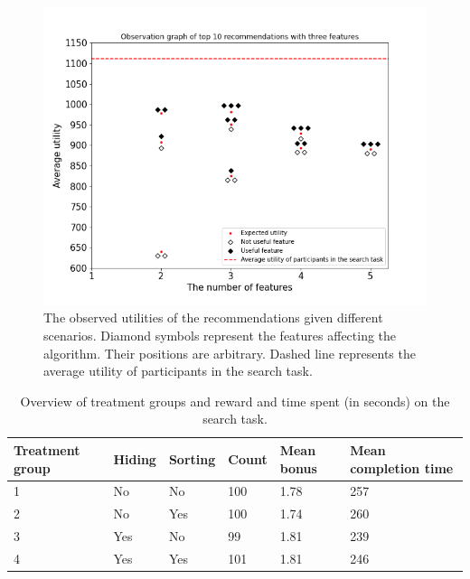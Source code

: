 \documentclass[a4paper,12pt]{article}
\begin{document}
\begin{figure}
    \centering
    \includegraphics[width=0.99\linewidth]{staticFiles/ThreeFeaturesObservedTop10SUMutility.png}
    \caption[Observed utilities of the recommendations]{The observed utilities of the recommendations given different scenarios. Diamond symbols represent the features affecting the algorithm. Their positions are arbitrary. Dashed line represents the average utility of participants in the search task.}
    \label{fig:actualRecommendationPerformance}
\end{figure}


\begin{table}[ht]
\centering
\begin{tabular}{p{2cm}lllp{2cm}p{2.5cm}}
\hline
\textbf{Treatment group} & \textbf{Hiding} & \textbf{Sorting} & \textbf{Count} & \textbf{Mean bonus} & \textbf{Mean completion time} \\ \hline
1                        & No               & No              & 100           & 1.78               & 257                          \\
2                        & No              & Yes              & 100           & 1.74               & 260                          \\
3                        & Yes               & No             & 99           & 1.81               & 239                          \\
4                        & Yes              & Yes             & 101           & 1.81               & 246                          \\ \hline
\end{tabular}
\caption[Overview of treatment groups]{Overview of treatment groups and reward and time spent (in seconds) on the search task.}
\label{tab:rewardandcompletion}
\end{table}
\end{document}
